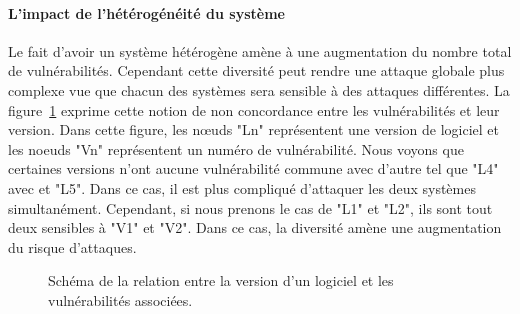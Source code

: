 \paragraph{L'impact de l'hétérogénéité du système}
Le fait d'avoir un système hétérogène amène à une augmentation du nombre total de vulnérabilités.
Cependant cette diversité peut rendre une attaque globale plus complexe vue que chacun des systèmes sera sensible à des attaques différentes.
La figure~\ref{fig:heteImpactVuln} exprime cette notion de non concordance entre les vulnérabilités et leur version.
Dans cette figure, les nœuds "Ln" représentent une version de logiciel et les noeuds "Vn" représentent un numéro de vulnérabilité.
Nous voyons que certaines versions n'ont aucune vulnérabilité commune avec d'autre tel que "L4" avec et "L5".
Dans ce cas, il est plus compliqué d'attaquer les deux systèmes simultanément.
Cependant, si nous prenons le cas de "L1" et "L2", ils sont tout deux sensibles à "V1" et "V2".
Dans ce cas, la diversité amène une augmentation du risque d'attaques.


\begin{figure}
\centering
\caption{Schéma de la relation entre la version d'un logiciel et les vulnérabilités associées.}
\label{fig:heteImpactVuln}
\end{figure}

